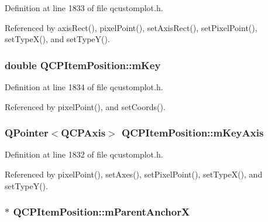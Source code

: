Definition at line 1833 of file qcustomplot.\+h.



Referenced by axis\+Rect(), pixel\+Point(), set\+Axis\+Rect(), set\+Pixel\+Point(), set\+Type\+X(), and set\+Type\+Y().

\hypertarget{class_q_c_p_item_position_a4ff3931ad115603dfb4c7000b24bb415}{}
\subsubsection[{m\+Key}]{\setlength{\rightskip}{0pt plus 5cm}double Q\+C\+P\+Item\+Position\+::m\+Key\hspace{0.3cm}{\ttfamily [protected]}}\label{class_q_c_p_item_position_a4ff3931ad115603dfb4c7000b24bb415}


Definition at line 1834 of file qcustomplot.\+h.



Referenced by pixel\+Point(), and set\+Coords().

\hypertarget{class_q_c_p_item_position_a63967a33933231e92f68c8ce06bfc37e}{}
\subsubsection[{m\+Key\+Axis}]{\setlength{\rightskip}{0pt plus 5cm}Q\+Pointer$<${\bf Q\+C\+P\+Axis}$>$ Q\+C\+P\+Item\+Position\+::m\+Key\+Axis\hspace{0.3cm}{\ttfamily [protected]}}\label{class_q_c_p_item_position_a63967a33933231e92f68c8ce06bfc37e}


Definition at line 1832 of file qcustomplot.\+h.



Referenced by pixel\+Point(), set\+Axes(), set\+Pixel\+Point(), set\+Type\+X(), and set\+Type\+Y().

\hypertarget{class_q_c_p_item_position_a41b4641d18c90997b9c01bf304181bf0}{}
\subsubsection[{m\+Parent\+Anchor\+X}]{$\ast$ Q\+C\+P\+Item\+Position\+::m\+Parent\+Anchor\+X\hspace{0.3cm}{\ttfamily [protected]}}\label{class_q_c_p_item_position_a41b4641d18c90997b9c01bf304181bf0}


